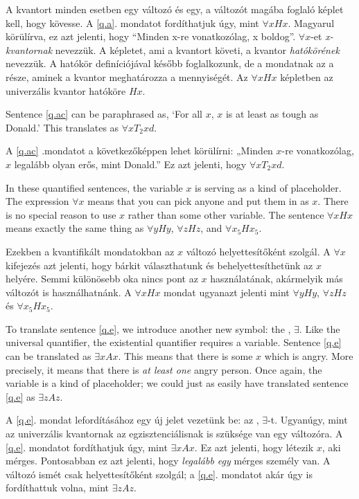 A kvantort minden esetben egy változó és egy, a változót magába foglaló képlet kell, hogy kövesse. A \ref{q.a}. mondatot fordíthatjuk úgy, mint $\forall x Hx$. Magyarul körülírva, ez azt jelenti, hogy “Minden x-re vonatkozólag, x boldog”. $\forall x$-et \emph{x-kvantornak} nevezzük. A képletet, ami a kvantort követi, a kvantor \emph{hatókörének} nevezzük. A hatókör definíciójával később foglalkozunk, de a mondatnak az a része, aminek a kvantor meghatározza a mennyiségét. Az $\forall x Hx$ képletben az univerzális kvantor hatóköre $Hx$.

Sentence \ref{q.ac} can be paraphrased as, `For all $x$, $x$ is at least as tough as Donald.' This translates as $\forall x T_2xd$.

A \ref{q.ac} .mondatot a következőképpen lehet körülírni: „Minden $x$-re vonatkozólag, $x$ legalább olyan erős, mint Donald.” Ez azt jelenti, hogy $\forall x T_2xd$.

In these quantified sentences, the variable $x$ is serving as a kind of placeholder. The expression $\forall x$ means that you can pick anyone and put them in as $x$. There is no special reason to use $x$ rather than some other variable. The sentence $\forall x Hx$ means exactly the same thing as $\forall y Hy$, $\forall z Hz$, and $\forall x_5 Hx_5$.

Ezekben a kvantifikált mondatokban az $x$ változó helyettesítőként szolgál. A $\forall x$ kifejezés azt jelenti, hogy bárkit választhatunk és behelyettesíthetünk az $x$ helyére. Semmi különösebb oka nincs pont az $x$ használatának, akármelyik más változót is használhatnánk. A $\forall x Hx$ mondat ugyanazt jelenti mint $\forall y Hy$, $\forall z Hz$ és $\forall x_5 Hx_5$.

To translate sentence \ref{q.e}, we introduce another new symbol: the , $\exists$. Like the universal quantifier, the existential quantifier requires a variable. Sentence \ref{q.e} can be translated as $\exists x Ax$. This means that there is some $x$ which is angry. More precisely, it means that there is \emph{at least one} angry person. Once again, the variable is a kind of placeholder; we could just as easily have translated sentence \ref{q.e} as $\exists z Az$.

A \ref{q.e}. mondat lefordításához egy új jelet vezetünk be: az , $\exists$-t. Ugyanúgy, mint az univerzális kvantornak az egzisztenciálisnak is szüksége van egy változóra. A \ref{q.e}. mondatot fordíthatjuk úgy, mint $\exists x Ax$. Ez azt jelenti, hogy létezik $x$, aki mérges. Pontosabban ez azt jelenti, hogy \emph{legalább egy} mérges személy van. A változó ismét csak helyettesítőként szolgál; a \ref{q.e}. mondatot akár úgy is fordíthattuk volna, mint $\exists z Az$.

